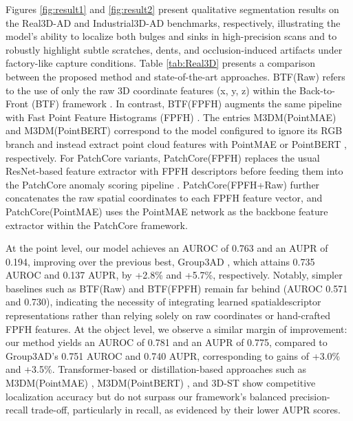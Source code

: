 Figures \ref{fig:result1} and \ref{fig:result2} present qualitative segmentation results on the Real3D-AD and Industrial3D-AD benchmarks, respectively, illustrating the model's ability to localize both bulges and sinks in high-precision scans and to robustly highlight subtle scratches, dents, and occlusion-induced artifacts under factory-like capture conditions. Table \ref{tab:Real3D} presents a comparison between the proposed method and state-of-the-art approaches. BTF(Raw) refers to the use of only the raw 3D coordinate features (x, y, z) within the Back-to-Front (BTF) framework \cite{horwitz2023back}. In contrast, BTF(FPFH) augments the same pipeline with Fast Point Feature Histograms (FPFH) \cite{rusu2009fast}. The entries M3DM(PointMAE) and M3DM(PointBERT) correspond to the model \cite{wang2023multimodal} configured to ignore its RGB branch and instead extract point cloud features with PointMAE \cite{pang2022masked} or PointBERT \cite{yu2022point}, respectively. For PatchCore variants, PatchCore(FPFH) replaces the usual ResNet-based feature extractor with FPFH descriptors \cite{rusu2009fast} before feeding them into the PatchCore anomaly scoring pipeline \cite{roth2022towards}. PatchCore(FPFH+Raw) further concatenates the raw spatial coordinates to each FPFH feature vector, and PatchCore(PointMAE) uses the PointMAE network \cite{pang2022masked} as the backbone feature extractor within the PatchCore framework.

At the point level, our model achieves an AUROC of 0.763 and an AUPR of 0.194, improving over the previous best, Group3AD \cite{zhu2024towards}, which attains 0.735 AUROC and 0.137 AUPR, by +2.8\% and +5.7\%, respectively. Notably, simpler baselines such as BTF(Raw) and BTF(FPFH) remain far behind (AUROC 0.571 and 0.730), indicating the necessity of integrating learned spatialdescriptor representations rather than relying solely on raw coordinates or hand-crafted FPFH features. At the object level, we observe a similar margin of improvement: our method yields an AUROC of 0.781 and an AUPR of 0.775, compared to Group3AD's 0.751 AUROC and 0.740 AUPR, corresponding to gains of +3.0\% and +3.5\%. Transformer-based or distillation-based approaches such as M3DM(PointMAE) \cite{wang2023multimodal}, M3DM(PointBERT) \cite{yu2022point}, and 3D-ST \cite{bergmann2023anomaly} show competitive localization accuracy but do not surpass our framework's balanced precision-recall trade-off, particularly in recall, as evidenced by their lower AUPR scores. 

